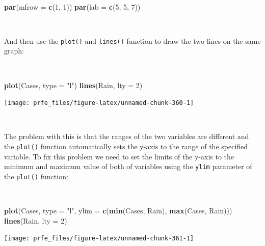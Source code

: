 \documentclass[12pt,a4paper]{book}
\newenvironment{Shaded}{\begin{snugshade}}{\end{snugshade}}
\newcommand{\DataTypeTok}[1]{\textcolor[rgb]{0.13,0.29,0.53}{#1}}
\newcommand{\DecValTok}[1]{\textcolor[rgb]{0.00,0.00,0.81}{#1}}
\newcommand{\KeywordTok}[1]{\textcolor[rgb]{0.13,0.29,0.53}{\textbf{#1}}}
\newcommand{\NormalTok}[1]{#1}
\newcommand{\StringTok}[1]{\textcolor[rgb]{0.31,0.60,0.02}{#1}}
\theoremstyle{definition}
\theoremstyle{definition}
\theoremstyle{definition}
\theoremstyle{remark}
\begin{document}
~

\begin{Shaded}
\begin{Highlighting}[]
\KeywordTok{par}\NormalTok{(}\DataTypeTok{mfrow =} \KeywordTok{c}\NormalTok{(}\DecValTok{1}\NormalTok{, }\DecValTok{1}\NormalTok{))}
\KeywordTok{par}\NormalTok{(}\DataTypeTok{lab =} \KeywordTok{c}\NormalTok{(}\DecValTok{5}\NormalTok{, }\DecValTok{5}\NormalTok{, }\DecValTok{7}\NormalTok{))}
\end{Highlighting}
\end{Shaded}

~

And then use the \texttt{plot()} and \texttt{lines()} function to draw
the two lines on the same graph:

~

\begin{Shaded}
\begin{Highlighting}[]
\KeywordTok{plot}\NormalTok{(Cases, }\DataTypeTok{type =} \StringTok{"l"}\NormalTok{)}
\KeywordTok{lines}\NormalTok{(Rain, }\DataTypeTok{lty =} \DecValTok{2}\NormalTok{)}
\end{Highlighting}
\end{Shaded}

\begin{center}\texttt{[image: prfe\_files/figure-latex/unnamed-chunk-360-1]} \end{center}

~

The problem with this is that the ranges of the two variables are
different and the \texttt{plot()} function automatically sets the y-axis
to the range of the specified variable. To fix this problem we need to
set the limits of the y-axis to the minimum and maximum value of both of
variables using the \texttt{ylim} parameter of the \texttt{plot()}
function:

~

\begin{Shaded}
\begin{Highlighting}[]
\KeywordTok{plot}\NormalTok{(Cases, }\DataTypeTok{type =} \StringTok{"l"}\NormalTok{, }\DataTypeTok{ylim =} \KeywordTok{c}\NormalTok{(}\KeywordTok{min}\NormalTok{(Cases, Rain), }\KeywordTok{max}\NormalTok{(Cases, Rain)))}
\KeywordTok{lines}\NormalTok{(Rain, }\DataTypeTok{lty =} \DecValTok{2}\NormalTok{)}
\end{Highlighting}
\end{Shaded}

\begin{center}\texttt{[image: prfe\_files/figure-latex/unnamed-chunk-361-1]} \end{center}
\end{document}
